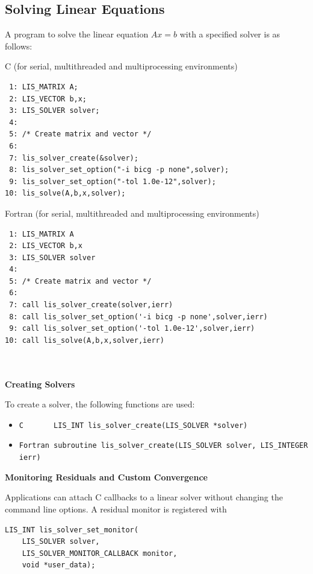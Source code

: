 \documentclass[a4paper]{article}
\begin{document}
\subsection{Solving Linear Equations}\label{subsec:solve}
A program to solve the linear equation $Ax = b$ with a specified 
solver is as follows: 
\begin{itembox}[l]{C (for serial, multithreaded and multiprocessing environments)}
\small
\begin{verbatim}
 1: LIS_MATRIX A; 
 2: LIS_VECTOR b,x; 
 3: LIS_SOLVER solver; 
 4:    
 5: /* Create matrix and vector */ 
 6:    
 7: lis_solver_create(&solver); 
 8: lis_solver_set_option("-i bicg -p none",solver); 
 9: lis_solver_set_option("-tol 1.0e-12",solver); 
10: lis_solve(A,b,x,solver); 
\end{verbatim}
\end{itembox}
\begin{itembox}[l]{Fortran (for serial, multithreaded and multiprocessing environments)}
\small
\begin{verbatim}
 1: LIS_MATRIX A 
 2: LIS_VECTOR b,x 
 3: LIS_SOLVER solver 
 4:    
 5: /* Create matrix and vector */ 
 6:    
 7: call lis_solver_create(solver,ierr) 
 8: call lis_solver_set_option('-i bicg -p none',solver,ierr) 
 9: call lis_solver_set_option('-tol 1.0e-12',solver,ierr) 
10: call lis_solve(A,b,x,solver,ierr) 
\end{verbatim}
\end{itembox}
\\ \\
\noindent
{\bf Creating Solvers}

To create a solver, the following functions are used:
\begin{itemize}
\item \verb|C       LIS_INT lis_solver_create(LIS_SOLVER *solver)|
\item \verb|Fortran subroutine lis_solver_create(LIS_SOLVER solver, LIS_INTEGER ierr) |
\end{itemize}

\noindent
{\bf Monitoring Residuals and Custom Convergence}

Applications can attach C callbacks to a linear solver without changing
the command line options. A residual monitor is registered with

\begin{verbatim}
LIS_INT lis_solver_set_monitor(
    LIS_SOLVER solver,
    LIS_SOLVER_MONITOR_CALLBACK monitor,
    void *user_data);
\end{verbatim}
\end{document}
